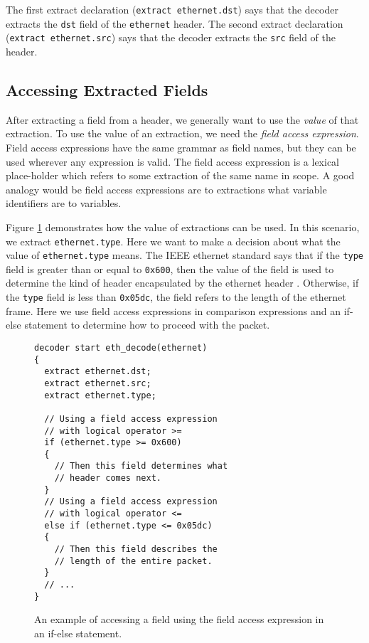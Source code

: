 The first extract declaration (\texttt{extract ethernet.dst}) says that the decoder extracts the \texttt{dst} field of the \texttt{ethernet} header. The second extract declaration (\texttt{extract ethernet.src}) says that the decoder extracts the \texttt{src} field of the  header. 

\subsection{Accessing Extracted Fields} \label{decoder_access_tut}

After extracting a field from a header, we generally want to use the \textit{value} of that extraction. To use the value of an extraction, we need the \textit{field access expression}. Field access expressions have the same grammar as field names, but they can be used wherever any expression is valid. The field access expression is a lexical place-holder which refers to some extraction of the same name in scope. A good analogy would be field access expressions are to extractions what variable identifiers are to variables.

Figure \ref{fg:access_ex} demonstrates how the value of extractions can be used. In this scenario, we extract \texttt{ethernet.type}. Here we want to make a decision about what the value of \texttt{ethernet.type} means. The IEEE ethernet standard says that if the \texttt{type} field is greater than or equal to \texttt{0x600}, then the value of the field is used to determine the kind of header encapsulated by the ethernet header \cite{eth_std}. Otherwise, if the \texttt{type} field is less than \texttt{0x05dc}, the field refers to the length of the ethernet frame. Here we use field access expressions in comparison expressions and an if-else statement to determine how to proceed with the packet. 

\begin{figure}[ht]
\begin{lstlisting}
decoder start eth_decode(ethernet)
{
  extract ethernet.dst;
  extract ethernet.src;
  extract ethernet.type;
  
  // Using a field access expression 
  // with logical operator >=
  if (ethernet.type >= 0x600)
  {
    // Then this field determines what
    // header comes next.
  }
  // Using a field access expression 
  // with logical operator <=
  else if (ethernet.type <= 0x05dc)
  {
    // Then this field describes the
    // length of the entire packet.
  }
  // ...
}
\end{lstlisting}
\caption{An example of accessing a field using the field access expression in an if-else statement.}
\label{fg:access_ex}
\end{figure}

